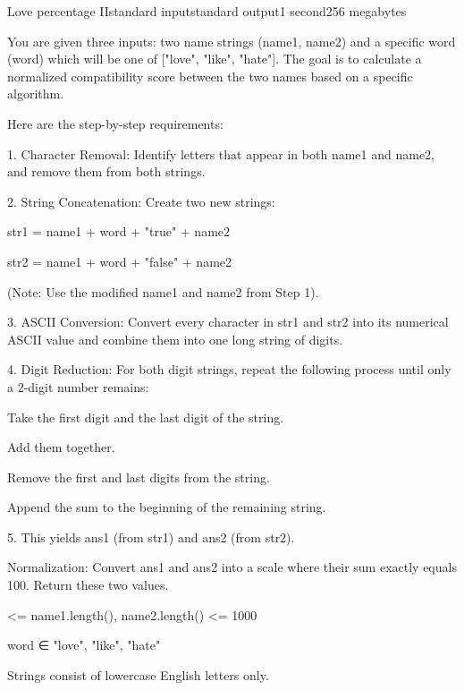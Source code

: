 \begin{problem}{Love percentage II}{standard input}{standard output}{1 second}{256 megabytes}

You are given three inputs: two name strings (name1, name2) and a specific word (word) which will be one of ["love", "like", "hate"]. The goal is to calculate a normalized compatibility score between the two names based on a specific algorithm.

Here are the step-by-step requirements:

1. Character Removal: Identify letters that appear in both name1 and name2, and remove them from both strings.

2. String Concatenation: Create two new strings:

    str1 = name1 + word + "true" + name2

    str2 = name1 + word + "false" + name2

   (Note: Use the modified name1 and name2 from Step 1).

3. ASCII Conversion: Convert every character in str1 and str2 into its numerical ASCII value and combine them into one long string of digits.

4. Digit Reduction: For both digit strings, repeat the following process until only a 2-digit number remains:

    Take the first digit and the last digit of the string.

    Add them together.

    Remove the first and last digits from the string.

    Append the sum to the beginning of the remaining string.

5. This yields ans1 (from str1) and ans2 (from str2).

Normalization: Convert ans1 and ans2 into a scale where their sum exactly equals 100. Return these two values.


 <= name1.length(), name2.length() <= 1000

word ∈ {"love", "like", "hate"}

Strings consist of lowercase English letters only.

\end{problem}

